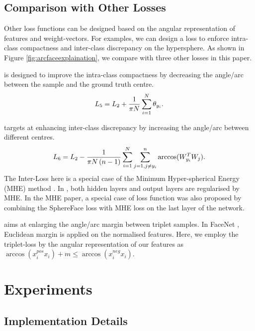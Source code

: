 \documentclass[10pt,twocolumn,letterpaper]{article}
\begin{document}
\subsection{Comparison with Other Losses}

Other loss functions can be designed based on the angular representation of features and weight-vectors. For examples, we can design a loss to enforce intra-class compactness and inter-class discrepancy on the hypersphere. As shown in Figure \ref{fig:arcfaceexplaination}, we compare with three other losses in this paper. 

 is designed to improve the intra-class compactness by decreasing the angle/arc between the sample and the ground truth centre.
\begin{equation}
L_5=L_2 + \frac{1}{\pi N} \sum_{i=1}^{N} \theta_{y_i}.
\label{eq:intraloss}
\vspace{-1mm}
\end{equation}

 targets at enhancing inter-class discrepancy by increasing the angle/arc between different centres. 
\begin{equation}
L_6=L_2 - \frac{1}{\pi N \left ( n -1\right )}  \sum_{i=1}^{N}  \sum_{j=1,j\neq y_i}^{n} \arccos(W^T_{y_i}W_j).
\label{eq:interloss}
\vspace{-1mm}
\end{equation}
The Inter-Loss here is a special case of the Minimum Hyper-spherical Energy (MHE) method \cite{liu2018learning}. In \cite{liu2018learning}, both hidden layers and output layers are regularised by MHE. In the MHE paper, a special case of loss function was also proposed by combining the SphereFace loss with MHE loss on the last layer of the network. 

 aims at enlarging the angle/arc margin between triplet samples. In FaceNet \cite{schroff2015facenet}, Euclidean margin is applied on the normalised features. Here, we employ the triplet-loss by the angular representation of our features as $\arccos({x_{i}^{pos} x_{i}}) + m \leq \arccos({x_i^{neg} x_{i}})$. 

\section{Experiments}

\subsection{Implementation Details}
\end{document}
